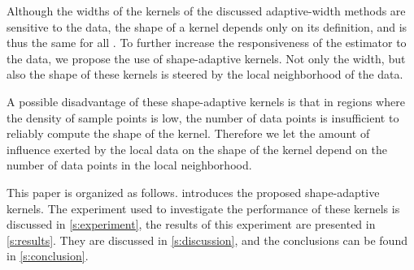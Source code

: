 	Although the widths of the kernels of the discussed adaptive-width methods are sensitive to the data, the shape of a kernel depends only on its definition, and is thus the same for all \varPattern[\itXis]. To further increase the responsiveness of the estimator to the data, we propose the use of shape-adaptive kernels. Not only the width, but also the shape of these kernels is steered by the local neighborhood of the data.

	A possible disadvantage of these shape-adaptive kernels is that in regions where the density of sample points is low, the number of data points is insufficient to reliably compute the shape of the kernel. Therefore we let the amount of influence exerted by the local data on the shape of the kernel depend on the number of data points in the local neighborhood.

	This paper is organized as follows.  introduces the proposed shape-adaptive kernels. The experiment used to investigate the performance of these kernels is discussed in \cref{s:experiment}, the results of this experiment are presented in \cref{s:results}. They are discussed in \cref{s:discussion}, and the conclusions can be found in \cref{s:conclusion}.